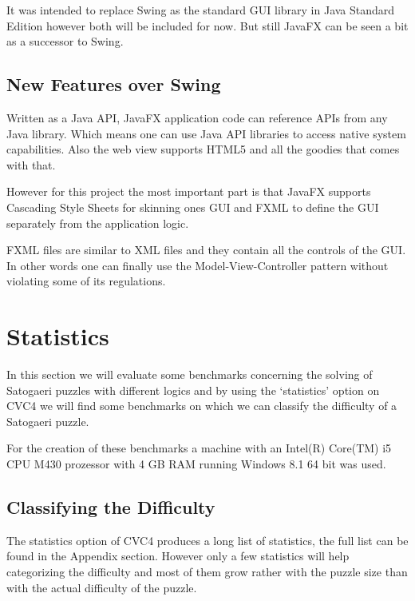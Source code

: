 It was intended to replace Swing as the standard GUI library in Java Standard Edition however both will be included for now. But still JavaFX can be seen a bit as a successor to Swing.

\section{New Features over Swing}
Written as a Java API, JavaFX application code can reference APIs from any Java library. Which means one can use Java API libraries to access native system capabilities. 
Also the web view supports HTML5 and all the goodies that comes with that.

However for this project the most important part is that JavaFX supports Cascading Style Sheets for skinning ones GUI and FXML to define the GUI separately from the application logic.

FXML files are similar to XML files and they contain all the controls of the GUI. In other words one can finally use the Model-View-Controller pattern without violating some of its regulations.

\chapter{Statistics} \label{Statistics}
In this section we will evaluate some benchmarks concerning the solving of Satogaeri puzzles with different logics and by using the `statistics' option on CVC4 we will find some benchmarks on which we can classify the difficulty of a Satogaeri puzzle.

For the creation of these benchmarks a machine with an Intel(R) Core(TM) i5 CPU M430 prozessor with 4 GB RAM running Windows 8.1 64 bit was used.

\section{Classifying the Difficulty}
The statistics option of CVC4 produces a long list of statistics, the full list can be found in the Appendix section. However only a few statistics will help categorizing the difficulty and most of them grow rather with the puzzle size than with the actual difficulty of the puzzle.


